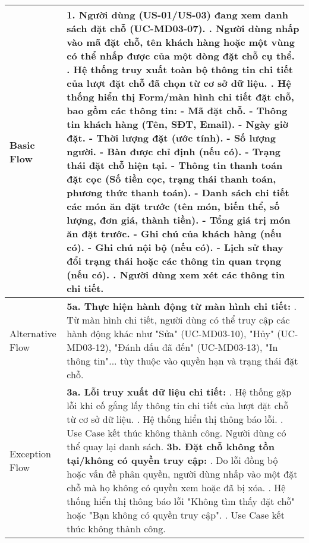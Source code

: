 \begin{longtable}{|m{4cm}|p{11cm}|}
Basic Flow & 1. Người dùng (US-01/US-03) đang xem danh sách đặt chỗ (UC-MD03-07). \newline 2. Người dùng nhấp vào mã đặt chỗ, tên khách hàng hoặc một vùng có thể nhấp được của một dòng đặt chỗ cụ thể. \newline 3. Hệ thống truy xuất toàn bộ thông tin chi tiết của lượt đặt chỗ đã chọn từ cơ sở dữ liệu. \newline 4. Hệ thống hiển thị Form/màn hình chi tiết đặt chỗ, bao gồm các thông tin: \newline    - Mã đặt chỗ. \newline    - Thông tin khách hàng (Tên, SĐT, Email). \newline    - Ngày giờ đặt. \newline    - Thời lượng đặt (ước tính). \newline    - Số lượng người. \newline    - Bàn được chỉ định (nếu có). \newline    - Trạng thái đặt chỗ hiện tại. \newline    - Thông tin thanh toán đặt cọc (Số tiền cọc, trạng thái thanh toán, phương thức thanh toán). \newline    - Danh sách chi tiết các món ăn đặt trước (tên món, biến thể, số lượng, đơn giá, thành tiền). \newline    - Tổng giá trị món ăn đặt trước. \newline    - Ghi chú của khách hàng (nếu có). \newline    - Ghi chú nội bộ (nếu có). \newline    - Lịch sử thay đổi trạng thái hoặc các thông tin quan trọng (nếu có). \newline 5. Người dùng xem xét các thông tin chi tiết. \\
\hline
Alternative Flow & \textbf{5a. Thực hiện hành động từ màn hình chi tiết:} \newline    1. Từ màn hình chi tiết, người dùng có thể truy cập các hành động khác như "Sửa" (UC-MD03-10), "Hủy" (UC-MD03-12), "Đánh dấu đã đến" (UC-MD03-13), "In thông tin"... tùy thuộc vào quyền hạn và trạng thái đặt chỗ. \\
\hline
Exception Flow & \textbf{3a. Lỗi truy xuất dữ liệu chi tiết:} \newline    1. Hệ thống gặp lỗi khi cố gắng lấy thông tin chi tiết của lượt đặt chỗ từ cơ sở dữ liệu. \newline    2. Hệ thống hiển thị thông báo lỗi. \newline    3. Use Case kết thúc không thành công. Người dùng có thể quay lại danh sách. \newline \textbf{3b. Đặt chỗ không tồn tại/không có quyền truy cập:} \newline    1. Do lỗi đồng bộ hoặc vấn đề phân quyền, người dùng nhấp vào một đặt chỗ mà họ không có quyền xem hoặc đã bị xóa. \newline    2. Hệ thống hiển thị thông báo lỗi "Không tìm thấy đặt chỗ" hoặc "Bạn không có quyền truy cập". \newline    3. Use Case kết thúc không thành công. \\

\end{longtable}
